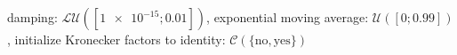 damping: $\mathcal{LU}([\num[scientific-notation=true]{1e-15}; \num[scientific-notation=true]{0.01}])$, exponential moving average: $\mathcal{U}([\num[scientific-notation=false]{0}; \num[scientific-notation=true]{0.99}])$, initialize Kronecker factors to identity: $\mathcal{C}(\{\text{no},\text{yes}\})$